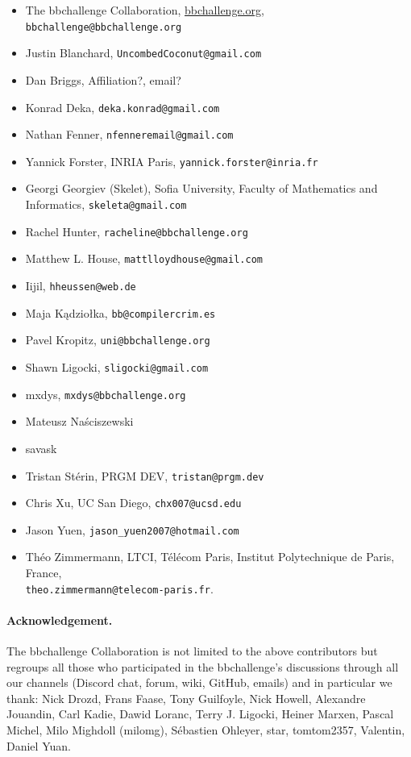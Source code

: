 \documentclass[a4paper,british]{article}
\theoremstyle{definition} %
\numberwithin{equation}{section}
\theoremstyle{definition} %
\newcommand{\ts}[1]{{\color{red}#1}}
\begin{document}
\begin{itemize}
    \item The bbchallenge Collaboration, \url{bbchallenge.org}, \texttt{bbchallenge@bbchallenge.org}
    \item Justin Blanchard, \texttt{UncombedCoconut@gmail.com}
    \item Dan Briggs, \ts{Affiliation?}, \ts{email?}
    \item Konrad Deka, \texttt{deka.konrad@gmail.com}
    \item Nathan Fenner, \texttt{nfenneremail@gmail.com}
    \item Yannick Forster, INRIA Paris, \texttt{yannick.forster@inria.fr}
    \item Georgi Georgiev (Skelet), Sofia University, Faculty of Mathematics and Informatics, \texttt{skeleta@gmail.com}
    \item Rachel Hunter, \texttt{racheline@bbchallenge.org}
    \item Matthew L. House, \texttt{mattlloydhouse@gmail.com}
    \item Iijil, \texttt{hheussen@web.de}
    \item Maja Kądziołka, \texttt{bb@compilercrim.es}
    \item Pavel Kropitz, \texttt{uni@bbchallenge.org}
    \item Shawn Ligocki, \texttt{sligocki@gmail.com}
    \item mxdys, \texttt{mxdys@bbchallenge.org}
    \item Mateusz Na\'{s}ciszewski
    \item savask
    \item Tristan Stérin, PRGM DEV, \texttt{tristan@prgm.dev}
    \item Chris Xu, UC San Diego, \texttt{chx007@ucsd.edu}
    \item Jason Yuen, \texttt{jason\_yuen2007@hotmail.com}
    \item Théo Zimmermann, LTCI, Télécom Paris, Institut Polytechnique de Paris, France, \\ \texttt{theo.zimmermann@telecom-paris.fr}.
\end{itemize}

\paragraph{Acknowledgement.} The bbchallenge Collaboration is not limited to the above contributors but regroups all those who participated in the bbchallenge's discussions through all our channels (Discord chat, forum, wiki, GitHub, emails) and in particular we thank:  Nick Drozd, Frans Faase, Tony Guilfoyle, Nick Howell, Alexandre Jouandin, Carl Kadie, Dawid Loranc, Terry J. Ligocki, Heiner Marxen, Pascal Michel, Milo Mighdoll (milomg), Sébastien Ohleyer, star, tomtom2357, Valentin, Daniel Yuan.
\end{document}
